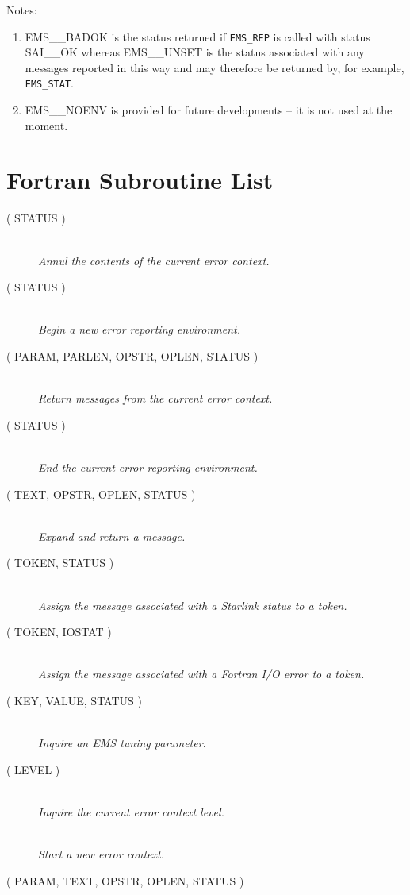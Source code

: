 \documentclass[twoside,11pt]{starlink}
\providecommand{\listline}{\hspace{1pt}\\}
\begin{document}
Notes:
\begin{enumerate}
\item EMS\_\_BADOK is the status returned if \texttt{EMS\_REP} is called with
status SAI\_\_OK whereas EMS\_\_UNSET is the status associated with any
messages reported in this way and may therefore be returned by, for example,
\texttt{EMS\_STAT}.
\item EMS\_\_NOENV is provided for future developments -- it is not used at
the moment.
\end{enumerate}

\newpage
\section{Fortran Subroutine List}
\begin {description}
\item [  ( STATUS )] \listline
\textit{Annul the contents of the current error context.}
\item [  ( STATUS )] \listline
\textit{Begin a new error reporting environment.}
\item [
( PARAM, PARLEN, OPSTR, OPLEN, STATUS )] \listline
\textit{Return messages from the current error context.}
\item [  ( STATUS )] \listline
\textit{End the current error reporting environment.}
\item [
( TEXT, OPSTR, OPLEN, STATUS )] \listline
\textit{Expand and return a message.}
\item [  ( TOKEN, STATUS )] \listline
\textit{Assign the message associated with a Starlink status to a token.}
\item [  ( TOKEN, IOSTAT )] \listline
\textit{Assign the message associated with a Fortran I/O error to a token.}
\item [ ( KEY, VALUE, STATUS )] \listline
\textit{Inquire an EMS tuning parameter.}
\item [  ( LEVEL )] \listline
\textit{Inquire the current error context level.}
\item [] \listline
\textit{Start a new error context.}
\item [
( PARAM, TEXT, OPSTR, OPLEN, STATUS )] \listline

\end{description}
\end{document}

